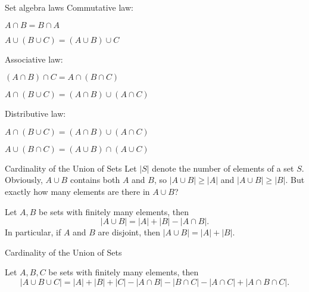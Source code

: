 





\begin{frame}{Set algebra laws}
Commutative law:

$A\cap B=B\cap A$

$A\cup (B\cup C)=(A\cup B)\cup C$

Associative law:

$(A\cap B)\cap C=A\cap (B\cap C)$

$A\cap (B\cup C)=(A\cap B)\cup (A\cap C)$

Distributive law:

$A\cap (B\cup C)=(A\cap B)\cup (A\cap C)$

$A\cup (B\cap C)=(A\cup B)\cap (A\cup C)$

\end{frame}


\begin{frame}{Cardinality of the Union of Sets}
Let $|S|$ denote the number of elements of a set $S$.  Obviously, $A\cup B$ contains both $A$ and $B$, so $|A\cup B|\geq |A|$ and $|A\cup B|\geq |B|$.  But exactly how many elements are there in $A\cup B$?

\begin{theorem} Let $A,B$ be sets with finitely many elements, then
$$|A\cup B|=|A|+|B|-|A\cap B|.$$  In particular, if $A$ and $B$ are disjoint, then $|A\cup B|=|A|+|B|$.
\end{theorem}

\end{frame}


\begin{frame}{Cardinality of the Union of Sets}

\begin{theorem} Let $A,B,C$ be sets with finitely many elements, then
$$|A\cup B \cup C|=|A|+|B|+|C|-|A\cap B|-|B\cap C|-|A\cap C|+|A\cap B \cap C|.$$ 
\end{theorem}
\end{frame}

